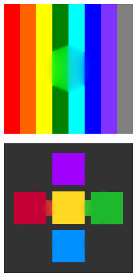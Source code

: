 \begin{figure}[H]
\begin{subfigure}{0.4\linewidth}
		\includegraphics[width=0.8\linewidth]{image/result_ex1/fixpoint03.png}			
	\end{subfigure}
	\begin{subfigure}{0.4\linewidth}
		\centering
		\includegraphics[width=0.8\linewidth]{image/result_ex1/fixpoint04.png}			
	\end{subfigure}
	\begin{subfigure}{0.4\linewidth}
		\centering

\end{subfigure}
\end{figure}
